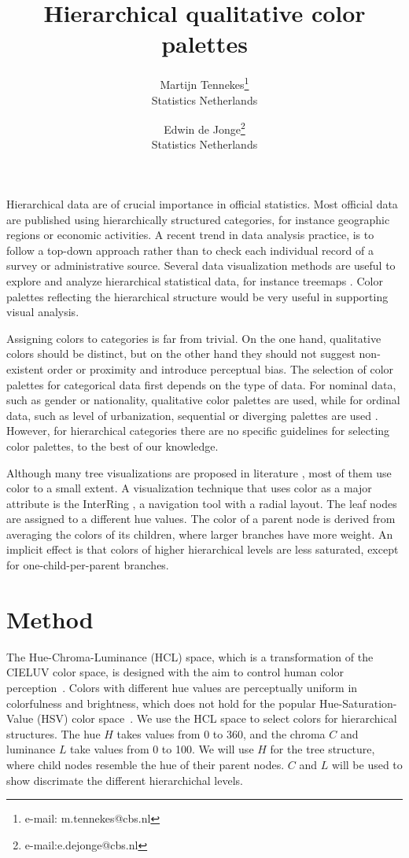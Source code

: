 \documentclass[review]{vgtc}                 %
\title{Hierarchical qualitative color palettes}
\author{Martijn Tennekes\thanks{e-mail: m.tennekes@cbs.nl}\\ %
        \scriptsize Statistics Netherlands %
\and Edwin de Jonge\thanks{e-mail:e.dejonge@cbs.nl}\\ %
     \scriptsize Statistics Netherlands}
\begin{document}

\maketitle

Hierarchical data are of crucial importance in official statistics. Most official data are published using hierarchically structured categories, for instance geographic regions or economic activities. A recent trend in data analysis practice, is to follow a top-down approach rather than to check  each individual record of a survey or administrative source. Several data visualization methods are useful to explore and analyze hierarchical statistical data, for instance treemaps
\cite{shneiderman1992,tennekes2011b}. Color palettes reflecting the  hierarchical structure would be very useful in supporting visual analysis.

Assigning colors to categories is far from trivial. On the one hand, qualitative colors should be distinct, but on the other hand they should not suggest non-existent order or proximity and introduce perceptual bias. The selection of color palettes for categorical data first depends on the type of data. For nominal data, such as gender or nationality, qualitative color palettes are used, while for ordinal data, such as level of urbanization, sequential or diverging palettes are used \cite{brewer03, zeileis2009}. However, for hierarchical categories there are no specific guidelines for selecting color palettes, to the best of our knowledge.

Although many tree visualizations are proposed in literature \cite{schulz2011}, most of them use color to a small extent. A visualization technique that uses color as a major attribute is the InterRing \cite{yang2002}, a navigation tool with a radial layout. The leaf nodes are assigned to a different hue values. The color of a parent node is derived from averaging the colors of its children, where larger branches have more weight. An implicit effect is that colors of higher hierarchical levels are less saturated, except for one-child-per-parent branches.


\section{Method}


The Hue-Chroma-Luminance (HCL) space, which is a transformation of the CIELUV color space, is designed with the aim to control human color perception~\cite{ihaka2003}.
Colors with different hue values are perceptually uniform in colorfulness and brightness, which does not hold for the popular Hue-Saturation-Value (HSV) color space~\cite{zeileis2009}. We use the HCL space to select colors for hierarchical structures. The hue $H$ takes values from 0 to 360, and the chroma $C$ and luminance $L$ take values from 0 to 100.
We will use $H$ for the tree structure, where child nodes resemble the hue of their parent nodes. $C$ and $L$ will be used to show discrimate the different hierarchichal levels.
\end{document}
